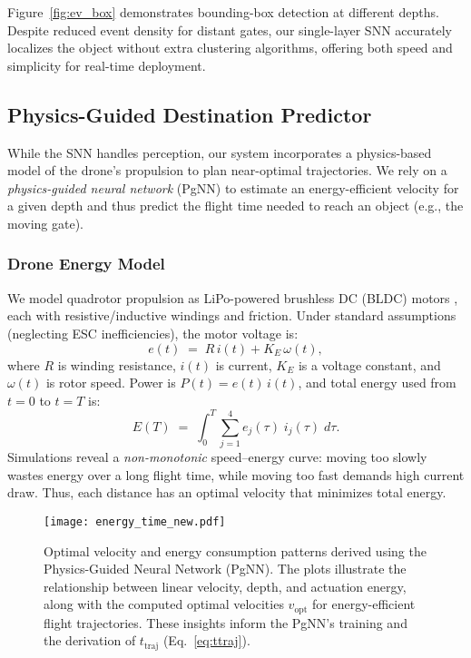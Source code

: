 Figure~\ref{fig:ev_box} demonstrates bounding-box detection at different depths. Despite reduced event density for distant gates, our single-layer SNN accurately localizes the object without extra clustering algorithms, offering both speed and simplicity for real-time deployment.

\subsection{\textbf{Physics-Guided Destination Predictor}}
\label{subsec:physics_guided}

While the SNN handles perception, our system incorporates a physics-based model of the drone’s propulsion to plan near-optimal trajectories. We rely on a \textit{physics-guided neural network} (PgNN) to estimate an energy-efficient velocity for a given depth and thus predict the flight time needed to reach an object (e.g., the moving gate).

\subsubsection{\textbf{Drone Energy Model}}
\label{phyro}

We model quadrotor propulsion as LiPo-powered brushless DC (BLDC) motors \cite{energy}, each with resistive/inductive windings and friction. Under standard assumptions (neglecting ESC inefficiencies), the motor voltage is:
\begin{equation}
    e(t) \;=\; R\,i(t) + K_E \,\omega(t),
\end{equation}
where $R$ is winding resistance, $i(t)$ is current, $K_E$ is a voltage constant, and $\omega(t)$ is rotor speed. Power is $P(t) = e(t)\,i(t)$, and total energy used from $t=0$ to $t = T$ is:
\begin{equation} \label{eq:E}
    E(T) \;=\; \int_{0}^{T} \sum_{j=1}^{4} e_j(\tau)\;i_j(\tau)\;d\tau.
\end{equation}
Simulations reveal a \textit{non-monotonic} speed–energy curve: moving too slowly wastes energy over a long flight time, while moving too fast demands high current draw. Thus, each distance has an optimal velocity that minimizes total energy.

\begin{figure*}[t]
    \centering
    \texttt{[image: energy\_time\_new.pdf]}
    \caption{Optimal velocity and energy consumption patterns derived using the Physics-Guided Neural Network (PgNN). The plots illustrate the relationship between linear velocity, depth, and actuation energy, along with the computed optimal velocities $v_{\mathrm{opt}}$ for energy-efficient flight trajectories. These insights inform the PgNN's training and the derivation of $t_{\mathrm{traj}}$ (Eq.~\ref{eq:ttraj}).}
    \label{fig:energy_time}
\end{figure*}


